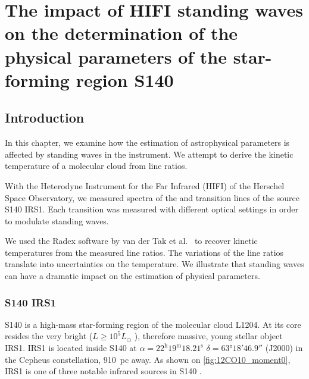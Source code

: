 \chapter{The impact of HIFI standing waves on the determination of the physical parameters of the star-forming region S140}
\label{sec:chapter5}
\section{Introduction}

In this chapter, we examine how the estimation of astrophysical parameters is affected by standing waves in the instrument.
We attempt to derive the kinetic temperature of a molecular cloud from  line ratios.

With the Heterodyne Instrument for the Far Infrared (HIFI) of the Herschel Space Observatory,
we measured spectra of the  and  transition lines of the source S140 IRS1.
Each transition was measured with different optical settings in order to modulate standing waves.

We used the Radex software by van der Tak et al.\ \cite{vandertak2007radex} to recover kinetic temperatures from the measured line ratios.
The variations of the line ratios translate into uncertainties on the temperature.
We illustrate that standing waves can have a dramatic impact on the estimation of physical parameters.

\subsection{S140 IRS1}
S140 is a high-mass star-forming region of the molecular cloud L1204.
At its core resides the very bright ($L \geqslant 10^5 L_{\odot}$ \cite{demuizon1980}), therefore massive, young stellar object IRS1.
IRS1 is located inside S140 at $\alpha = 22^\text{h} 19^\text{m} 18.21^\text{s}$ $\delta = \ang{63;18;46.9}$ (J2000) in the Cepheus constellation, \SI{910}{pc} away.
As shown on \cref{fig:12CO10_moment0}, IRS1 is one of three notable infrared sources in S140 \cite{maud2013s140}.

